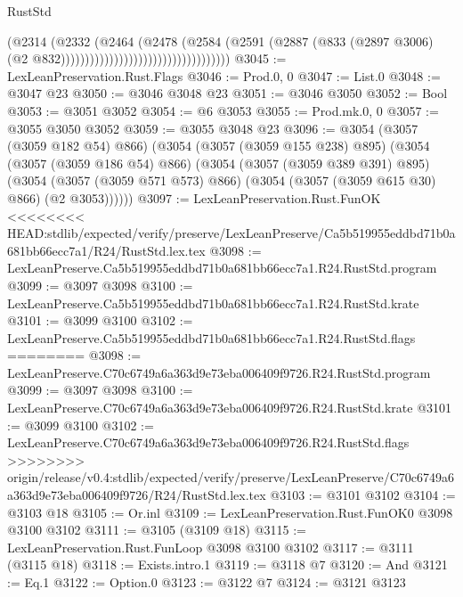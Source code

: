 \begin{lexlean}{RustStd}
\begin{coremodule}
{\begin{coremodule}
{{{{{{{{{{{{{{{{{{{{{{{{{{                                                        (@2314
                                                          (@2332
                                                            (@2464
                                                              (@2478
                                                                (@2584
                                                                  (@2591
                                                                    (@2887
                                                                      (@833
                                                                        (@2897 @3006)
                                                                        (@2
                                                                          @832)))))))))))))))))))))))))))))))))))
@3045 := LexLeanPreservation.Rust.Flags
@3046 := Prod.{0, 0}
@3047 := List.{0}
@3048 := @3047 @23
@3050 := @3046 @3048 @23
@3051 := @3046 @3050
@3052 := Bool
@3053 := @3051 @3052
@3054 := @6 @3053
@3055 := Prod.mk.{0, 0}
@3057 := @3055 @3050 @3052
@3059 := @3055 @3048 @23
@3096 := @3054
    (@3057 (@3059 @182 @54) @866)
    (@3054
      (@3057 (@3059 @155 @238) @895)
      (@3054
        (@3057 (@3059 @186 @54) @866)
        (@3054
          (@3057 (@3059 @389 @391) @895)
          (@3054 (@3057 (@3059 @571 @573) @866) (@3054 (@3057 (@3059 @615 @30) @866) (@2 @3053))))))
@3097 := LexLeanPreservation.Rust.FunOK
<<<<<<<< HEAD:stdlib/expected/verify/preserve/LexLeanPreserve/Ca5b519955eddbd71b0a681bb66ecc7a1/R24/RustStd.lex.tex
@3098 := LexLeanPreserve.Ca5b519955eddbd71b0a681bb66ecc7a1.R24.RustStd.program
@3099 := @3097 @3098
@3100 := LexLeanPreserve.Ca5b519955eddbd71b0a681bb66ecc7a1.R24.RustStd.krate
@3101 := @3099 @3100
@3102 := LexLeanPreserve.Ca5b519955eddbd71b0a681bb66ecc7a1.R24.RustStd.flags
========
@3098 := LexLeanPreserve.C70c6749a6a363d9e73eba006409f9726.R24.RustStd.program
@3099 := @3097 @3098
@3100 := LexLeanPreserve.C70c6749a6a363d9e73eba006409f9726.R24.RustStd.krate
@3101 := @3099 @3100
@3102 := LexLeanPreserve.C70c6749a6a363d9e73eba006409f9726.R24.RustStd.flags
>>>>>>>> origin/release/v0.4:stdlib/expected/verify/preserve/LexLeanPreserve/C70c6749a6a363d9e73eba006409f9726/R24/RustStd.lex.tex
@3103 := @3101 @3102
@3104 := @3103 @18
@3105 := Or.inl
@3109 := LexLeanPreservation.Rust.FunOK0 @3098 @3100 @3102
@3111 := @3105 (@3109 @18)
@3115 := LexLeanPreservation.Rust.FunLoop @3098 @3100 @3102
@3117 := @3111 (@3115 @18)
@3118 := Exists.intro.{1}
@3119 := @3118 @7
@3120 := And
@3121 := Eq.{1}
@3122 := Option.{0}
@3123 := @3122 @7
@3124 := @3121 @3123
}}}}}}}}}}}}}}}}}}}}}}}}}}
\end{coremodule}}
\end{coremodule}
\end{lexlean}
